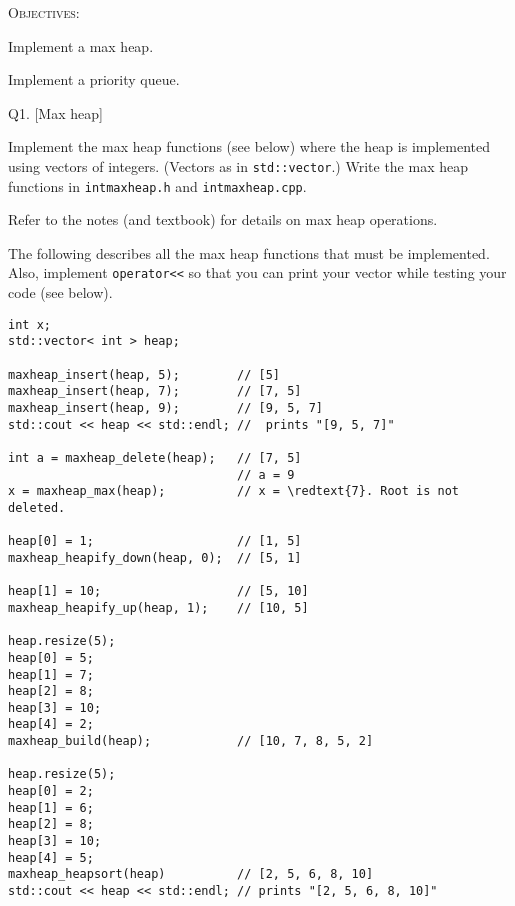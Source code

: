 


\renewcommand\TITLE{Assignment 14}

\usepackage{listings}
\lstset{%
basicstyle=\ttfamily, frame=single
}



\topmatter


\textsc{Objectives:}
\begin{tightlist}
\item Implement a max heap.
\item Implement a priority queue.
\end{tightlist}


\newpage
Q1. [Max heap]

Implement the max heap functions (see below)
where the heap is implemented
using vectors of integers.
(Vectors as in \texttt{std::vector}.)
Write the max heap functions in
\texttt{intmaxheap.h}
and
\texttt{intmaxheap.cpp}.

Refer to the notes (and textbook) for details
on max heap operations.

The following describes all the max heap functions that
must be implemented.
Also, implement \verb!operator<<! so that you can
print your vector while testing your code (see below).
\begin{Verbatim}[frame=single, commandchars=\\\{\}]
int x;
std::vector< int > heap;

maxheap_insert(heap, 5);        // [5]
maxheap_insert(heap, 7);        // [7, 5]
maxheap_insert(heap, 9);        // [9, 5, 7]
std::cout << heap << std::endl; //  prints "[9, 5, 7]"

int a = maxheap_delete(heap);   // [7, 5]
                                // a = 9
x = maxheap_max(heap);          // x = \redtext{7}. Root is not deleted.

heap[0] = 1;                    // [1, 5]
maxheap_heapify_down(heap, 0);  // [5, 1]

heap[1] = 10;                   // [5, 10]
maxheap_heapify_up(heap, 1);    // [10, 5]

heap.resize(5);
heap[0] = 5;
heap[1] = 7;
heap[2] = 8;
heap[3] = 10;
heap[4] = 2;
maxheap_build(heap);            // [10, 7, 8, 5, 2]

heap.resize(5);
heap[0] = 2;
heap[1] = 6;
heap[2] = 8;
heap[3] = 10;
heap[4] = 5;
maxheap_heapsort(heap)          // [2, 5, 6, 8, 10]
std::cout << heap << std::endl; // prints "[2, 5, 6, 8, 10]"
\end{Verbatim}

